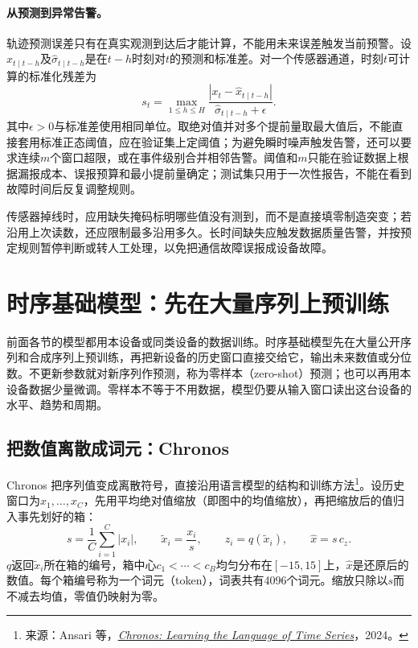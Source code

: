 \paragraph{从预测到异常告警。}
轨迹预测误差只有在真实观测到达后才能计算，不能用未来误差触发当前预警。设$\hat x_{t\mid t-h}$及$\hat\sigma_{t\mid t-h}$是在$t-h$时刻对$t$的预测和标准差。对一个传感器通道，时刻$t$可计算的标准化残差为
\begin{equation}
 s_t=\max_{1\leq h\leq H}\frac{|x_t-\hat x_{t\mid t-h}|}{\hat\sigma_{t\mid t-h}+\epsilon}.
\end{equation}
其中$\epsilon>0$与标准差使用相同单位。取绝对值并对多个提前量取最大值后，不能直接套用标准正态阈值，应在验证集上定阈值；为避免瞬时噪声触发告警，还可以要求连续$m$个窗口超限，或在事件级别合并相邻告警。阈值和$m$只能在验证数据上根据漏报成本、误报预算和最小提前量确定；测试集只用于一次性报告，不能在看到故障时间后反复调整规则。

传感器掉线时，应用缺失掩码标明哪些值没有测到，而不是直接填零制造突变；若沿用上次读数，还应限制最多沿用多久。长时间缺失应触发数据质量告警，并按预定规则暂停判断或转人工处理，以免把通信故障误报成设备故障。

\section{时序基础模型：先在大量序列上预训练}
\label{sec:sequence-foundation}
前面各节的模型都用本设备或同类设备的数据训练。时序基础模型先在大量公开序列和合成序列上预训练，再把新设备的历史窗口直接交给它，输出未来数值或分位数。不更新参数就对新序列作预测，称为零样本（zero-shot）预测；也可以再用本设备数据少量微调。零样本不等于不用数据，模型仍要从输入窗口读出这台设备的水平、趋势和周期。

\subsection{把数值离散成词元：Chronos}
Chronos 把序列值变成离散符号，直接沿用语言模型的结构和训练方法\footnote{来源：Ansari 等，\href{https://arxiv.org/abs/2403.07815}{\textit{Chronos: Learning the Language of Time Series}}，2024。}。设历史窗口为$x_1,\ldots,x_C$，先用平均绝对值缩放（即图中的均值缩放），再把缩放后的值归入事先划好的箱：
\begin{equation}
 s=\frac1C\sum_{i=1}^{C}|x_i|,\qquad \tilde x_i=\frac{x_i}{s},\qquad
 z_i=q(\tilde x_i),\qquad \hat x=s\,c_{z}.
 \label{eq:sequence-chronos-token}
\end{equation}
$q$返回$\tilde x_i$所在箱的编号，箱中心$c_1<\cdots<c_B$均匀分布在$[-15,15]$上，$\hat x$是还原后的数值。每个箱编号称为一个词元（token），词表共有4096个词元。缩放只除以$s$而不减去均值，零值仍映射为零。

